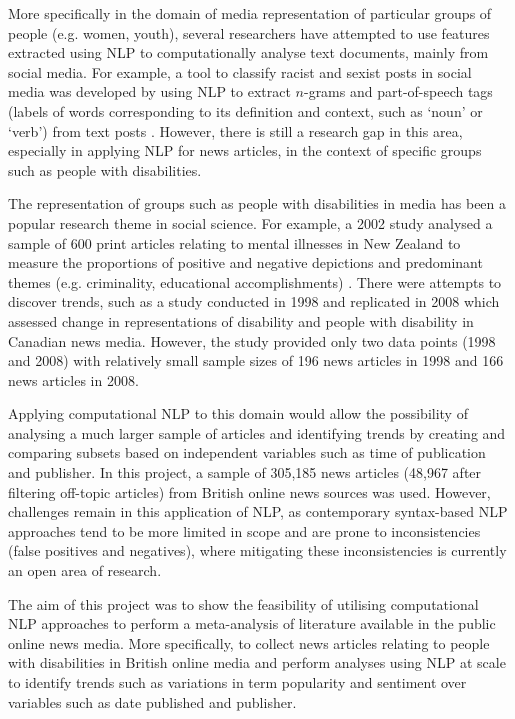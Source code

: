 \documentclass{report}
\begin{document}
More specifically in the domain of media representation of particular groups of people (e.g. women, youth), several researchers have attempted to use features extracted using NLP to computationally analyse text documents, mainly from social media.
For example, a tool to classify racist and sexist posts in social media was developed by using NLP to extract $n$-grams and part-of-speech tags (labels of words corresponding to its definition and context, such as `noun' or `verb') from text posts \cite{waseem2016you}.
However, there is still a research gap in this area, especially in applying NLP for news articles, in the context of specific groups such as people with disabilities.

The representation of groups such as people with disabilities in media has been a popular research theme in social science.
For example, a 2002 study analysed a sample of 600 print articles relating to mental illnesses in New Zealand to measure the proportions of positive and negative depictions and predominant themes (e.g. criminality, educational accomplishments) \cite{coverdale2002depictions}.
There were attempts to discover trends, such as a study conducted in 1998 \cite{gold1999media} and replicated in 2008 \cite{devotta2013representations} which assessed change in representations of disability and people with disability in Canadian news media.
However, the study provided only two data points (1998 and 2008) with relatively small sample sizes of 196 news articles in 1998 and 166 news articles in 2008.

Applying computational NLP to this domain would allow the possibility of analysing a much larger sample of articles and identifying trends by creating and comparing subsets based on independent variables such as time of publication and publisher.
In this project, a sample of 305,185 news articles (48,967 after filtering off-topic articles) from British online news sources was used.
However, challenges remain in this application of NLP, as contemporary syntax-based NLP approaches tend to be more limited in scope and are prone to inconsistencies (false positives and negatives), where mitigating these inconsistencies is currently an open area of research. %

The aim of this project was to show the feasibility of utilising computational NLP approaches to perform a meta-analysis of literature available in the public online news media.
More specifically, to collect news articles relating to people with disabilities in British online media and perform analyses using NLP at scale to identify trends such as variations in term popularity and sentiment over variables such as date published and publisher.
\end{document}
